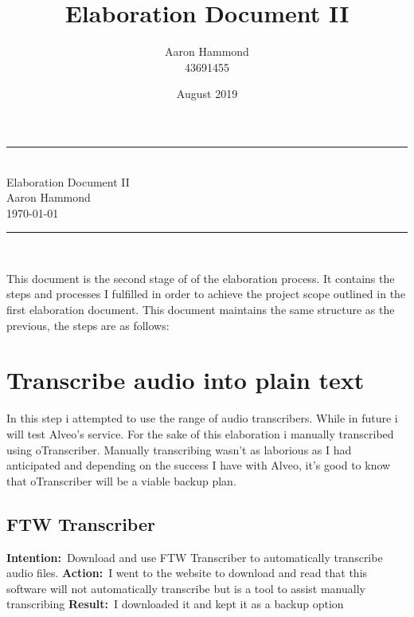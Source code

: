 \documentclass{article}
\title{Elaboration Document II}
\author{Aaron Hammond\\43691455}
\date{August 2019}
\newcommand\HRule{\rule{\textwidth}{1pt}} %
\newcommand{\intention}[1]{\noindent \textbf{Intention:}{\textnormal\ #1} \newline}
\newcommand{\action}[1]{\textbf{Action:}{\textnormal\ #1} \newline}
\newcommand{\result}[1]{\textbf{Result:}{\textnormal\ #1} \newline}
\begin{document}

\begin{titlepage}


\begin{center}
\HRule\\[0.4cm]
\huge{Elaboration Document II}\\[0.4cm]
\huge{Aaron Hammond}\\[0.3cm]
\large{\today}\\[0.4cm]

\HRule \\[1cm]
\end{center}

\begin{justify}
\noindent This document is the second stage of of the elaboration process. It contains the steps and processes I fulfilled in order to achieve the project scope outlined in the first elaboration document. This document maintains the same structure as the previous, the steps are as follows:
\end{justify}


\def\contentsname{\empty} %
\tableofcontents

\end{titlepage}


\section{Transcribe audio into plain text}
In this step i attempted to use the range of audio transcribers. While in future i will test Alveo's service. For the sake of this elaboration i manually transcribed using oTranscriber. Manually transcribing wasn't as laborious as I had anticipated and depending on the success I have with Alveo, it's good to know that oTranscriber will be a viable backup plan.

\subsection{FTW Transcriber}
\intention{Download and use FTW Transcriber to automatically transcribe audio files.}
\action{I went to the website to download and read that this software will not automatically transcribe but is a tool to assist manually transcribing}
\result{I downloaded it and kept it as a backup option}
\end{document}

